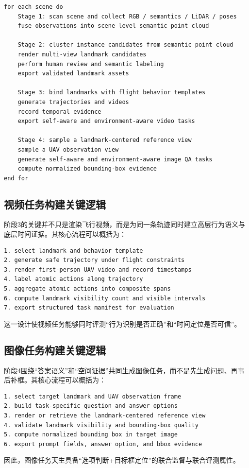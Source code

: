 \begin{thesisappendix}
\begin{verbatim}
for each scene do
    Stage 1: scan scene and collect RGB / semantics / LiDAR / poses
    fuse observations into scene-level semantic point cloud

    Stage 2: cluster instance candidates from semantic point cloud
    render multi-view landmark candidates
    perform human review and semantic labeling
    export validated landmark assets

    Stage 3: bind landmarks with flight behavior templates
    generate trajectories and videos
    record temporal evidence
    export self-aware and environment-aware video tasks

    Stage 4: sample a landmark-centered reference view
    sample a UAV observation view
    generate self-aware and environment-aware image QA tasks
    compute normalized bounding-box evidence
end for
\end{verbatim}

\subsection{视频任务构建关键逻辑}

阶段3的关键并不只是渲染飞行视频，而是为同一条轨迹同时建立高层行为语义与底层时间证据。其核心流程可以概括为：
\begin{verbatim}
1. select landmark and behavior template
2. generate safe trajectory under flight constraints
3. render first-person UAV video and record timestamps
4. label atomic actions along trajectory
5. aggregate atomic actions into composite spans
6. compute landmark visibility count and visible intervals
7. export structured task manifest for evaluation
\end{verbatim}
这一设计使视频任务能够同时评测“行为识别是否正确”和“时间定位是否可信”。

\subsection{图像任务构建关键逻辑}

阶段4围绕“答案语义”和“空间证据”共同生成图像任务，而不是先生成问题、再事后补框。其核心流程可以概括为：
\begin{verbatim}
1. select target landmark and UAV observation frame
2. build task-specific question and answer options
3. render or retrieve the landmark-centered reference view
4. validate landmark visibility and bounding-box quality
5. compute normalized bounding box in target image
6. export prompt fields, answer option, and bbox evidence
\end{verbatim}
因此，图像任务天生具备“选项判断+目标框定位”的联合监督与联合评测属性。
\end{thesisappendix}

